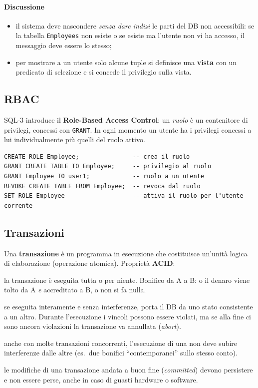 \documentclass[a4paper,12pt]{article}
\begin{document}
\paragraph{Discussione}
\begin{itemize}
  \item il sistema deve nascondere \emph{senza dare indizi} le parti del DB
    non accessibili: se la tabella \texttt{Employees} non esiste o se esiste
    ma l'utente non vi ha accesso, il messaggio deve essere lo stesso;
  \item per mostrare a un utente solo alcune tuple si definisce una
    \textbf{vista} con un predicato di selezione e si concede il privilegio
    sulla vista.
\end{itemize}

\subsection{RBAC}

SQL-3 introduce il \textbf{Role-Based Access Control}: un \emph{ruolo} è un
contenitore di privilegi, concessi con \texttt{GRANT}. In ogni momento un
utente ha i privilegi concessi a lui individualmente più quelli del ruolo
attivo.
\begin{verbatim}
CREATE ROLE Employee;               -- crea il ruolo
GRANT CREATE TABLE TO Employee;     -- privilegio al ruolo
GRANT Employee TO user1;            -- ruolo a un utente
REVOKE CREATE TABLE FROM Employee;  -- revoca dal ruolo
SET ROLE Employee                   -- attiva il ruolo per l'utente corrente
\end{verbatim}

\subsection{Transazioni}

Una \textbf{transazione} è un programma in esecuzione che costituisce
un'unità logica di elaborazione (operazione atomica). Proprietà
\textbf{ACID}:
\begin{description}[style=nextline]
  \item[Atomicità] la transazione è eseguita tutta o per niente. Bonifico da A
    a B: o il denaro viene tolto da A \emph{e} accreditato a B, o non si fa
    nulla.
  \item[Consistenza] se eseguita interamente e senza interferenze, porta il DB
    da uno stato consistente a un altro. Durante l'esecuzione i vincoli possono
    essere violati, ma se alla fine ci sono ancora violazioni la transazione
    va annullata (\emph{abort}).
  \item[Isolamento] anche con molte transazioni concorrenti, l'esecuzione di
    una non deve subire interferenze dalle altre (es.\ due bonifici
    ``contemporanei'' sullo stesso conto).
  \item[Durabilità] le modifiche di una transazione andata a buon fine
    (\emph{committed}) devono persistere e non essere perse, anche in caso di
    guasti hardware o software.
\end{description}
\end{document}
